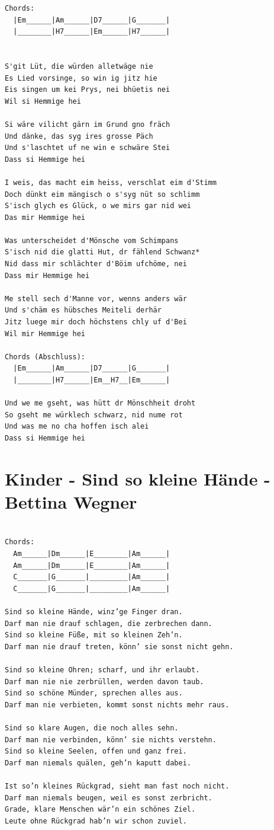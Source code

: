 \documentclass[
]{book}
\let\stdsection\section
\renewcommand\section{\clearpage\stdsection}
\begin{document}
\begin{verbatim}
Chords:
  |Em______|Am______|D7______|G_______|
  |________|H7______|Em______|H7______|


S'git Lüt, die würden alletwäge nie
Es Lied vorsinge, so win ig jitz hie
Eis singen um kei Prys, nei bhüetis nei
Wil si Hemmige hei

Si wäre vilicht gärn im Grund gno fräch
Und dänke, das syg ires grosse Päch
Und s'laschtet uf ne win e schwäre Stei
Dass si Hemmige hei

I weis, das macht eim heiss, verschlat eim d'Stimm
Doch dünkt eim mängisch o s'syg nüt so schlimm
S'isch glych es Glück, o we mirs gar nid wei
Das mir Hemmige hei

Was unterscheidet d'Mönsche vom Schimpans
S'isch nid die glatti Hut, dr fählend Schwanz*
Nid dass mir schlächter d'Böim ufchöme, nei
Dass mir Hemmige hei

Me stell sech d'Manne vor, wenns anders wär
Und s'chäm es hübsches Meiteli derhär
Jitz luege mir doch höchstens chly uf d'Bei
Wil mir Hemmige hei

Chords (Abschluss):
  |Em______|Am______|D7______|G_______|
  |________|H7______|Em__H7__|Em______| 

Und we me gseht, was hütt dr Mönschheit droht
So gseht me würklech schwarz, nid nume rot
Und was me no cha hoffen isch alei
Dass si Hemmige hei
\end{verbatim}

\hypertarget{kinder---sind-so-kleine-huxe4nde---bettina-wegner}{%
\section{Kinder - Sind so kleine Hände - Bettina Wegner}\label{kinder---sind-so-kleine-huxe4nde---bettina-wegner}}

\begin{verbatim}

Chords:
  Am______|Dm______|E________|Am______|
  Am______|Dm______|E________|Am______|
  C_______|G_______|_________|Am______|
  C_______|G_______|_________|Am______|

Sind so kleine Hände, winz’ge Finger dran.
Darf man nie drauf schlagen, die zerbrechen dann.
Sind so kleine Füße, mit so kleinen Zeh’n.
Darf man nie drauf treten, könn’ sie sonst nicht gehn.

Sind so kleine Ohren; scharf, und ihr erlaubt.
Darf man nie nie zerbrüllen, werden davon taub.
Sind so schöne Münder, sprechen alles aus.
Darf man nie verbieten, kommt sonst nichts mehr raus.

Sind so klare Augen, die noch alles sehn.
Darf man nie verbinden, könn’ sie nichts verstehn.
Sind so kleine Seelen, offen und ganz frei.
Darf man niemals quälen, geh’n kaputt dabei.

Ist so’n kleines Rückgrad, sieht man fast noch nicht.
Darf man niemals beugen, weil es sonst zerbricht.
Grade, klare Menschen wär’n ein schönes Ziel.
Leute ohne Rückgrad hab’n wir schon zuviel.
\end{verbatim}
\end{document}
